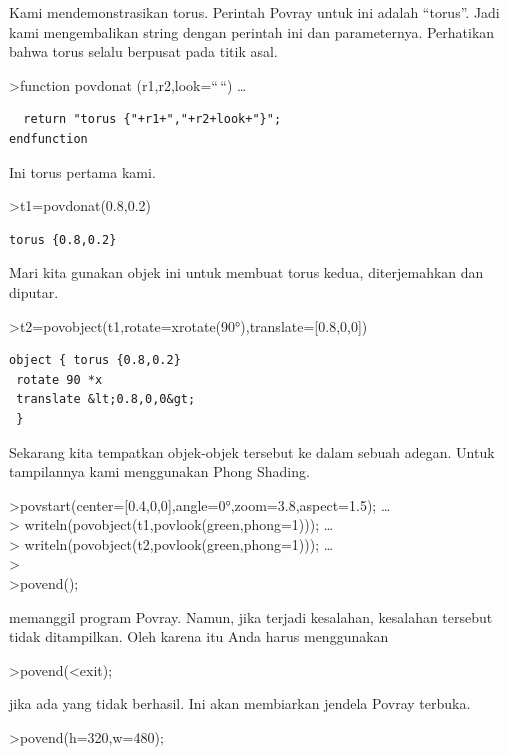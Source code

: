\documentclass[
]{book}
\begin{document}
Kami mendemonstrasikan torus. Perintah Povray untuk ini adalah ``torus''. Jadi kami mengembalikan string dengan perintah ini dan parameternya. Perhatikan bahwa torus selalu berpusat pada titik asal.

\textgreater function povdonat (r1,r2,look=``\,``) \ldots{}

\begin{verbatim}
  return "torus {"+r1+","+r2+look+"}";
endfunction
\end{verbatim}

Ini torus pertama kami.

\textgreater t1=povdonat(0.8,0.2)

\begin{verbatim}
torus {0.8,0.2}
\end{verbatim}

Mari kita gunakan objek ini untuk membuat torus kedua, diterjemahkan dan diputar.

\textgreater t2=povobject(t1,rotate=xrotate(90°),translate={[}0.8,0,0{]})

\begin{verbatim}
object { torus {0.8,0.2}
 rotate 90 *x 
 translate &lt;0.8,0,0&gt;
 }
\end{verbatim}

Sekarang kita tempatkan objek-objek tersebut ke dalam sebuah adegan. Untuk tampilannya kami menggunakan Phong Shading.

\textgreater povstart(center={[}0.4,0,0{]},angle=0°,zoom=3.8,aspect=1.5); \ldots{}\\
\textgreater{} writeln(povobject(t1,povlook(green,phong=1))); \ldots{}\\
\textgreater{} writeln(povobject(t2,povlook(green,phong=1))); \ldots{}\\
\textgreater{}\\
\textgreater povend();

memanggil program Povray. Namun, jika terjadi kesalahan, kesalahan tersebut tidak ditampilkan. Oleh karena itu Anda harus menggunakan

\textgreater povend(\textless exit);

jika ada yang tidak berhasil. Ini akan membiarkan jendela Povray terbuka.

\textgreater povend(h=320,w=480);
\end{document}
